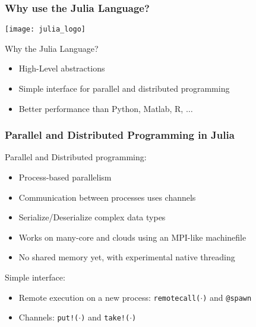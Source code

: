 \documentclass[10pt, compress, aspectratio=169, xcolor=table]{beamer}
\begin{document}
\begin{frame}
    \frametitle{Why use the Julia Language?}
    \begin{center}
        \texttt{[image: julia\_logo]}
    \end{center}

    Why the \alert{Julia Language}?

    \begin{itemize}
        \item \alert{High-Level abstractions}
        \item \alert{Simple interface} for parallel and distributed programming
        \item \alert{Better performance} than Python, Matlab, R, $\dots$
    \end{itemize}
\end{frame}

\begin{frame}
    \frametitle{Parallel and Distributed Programming in Julia}
    Parallel and Distributed programming:

    \begin{itemize}
        \item \alert{Process-based} parallelism
        \item \alert{Communication} between processes uses \alert{channels}
        \item \alert{Serialize/Deserialize} complex data types
            \pause
        \item Works on \alert{many-core and clouds} using an MPI-like \alert{machinefile}
        \item \alert{No shared memory} yet, with \alert{experimental native threading}
    \end{itemize}

    \pause

    Simple interface:

    \begin{itemize}
        \item \alert{Remote execution} on a \alert{new process}: \texttt{remotecall($\cdot$)} and \texttt{@spawn}
        \item \alert{Channels}: \texttt{put!($\cdot$)} and \texttt{take!($\cdot$)}
    \end{itemize}
\end{frame}
\end{document}
